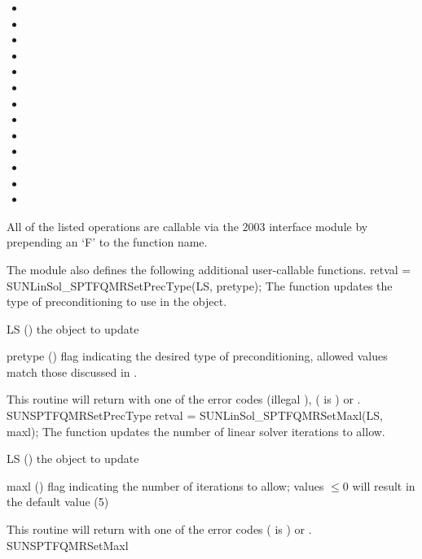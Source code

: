 \begin{itemize}
\item {}
\item {}
\item {}
\item {}
\item {}
\item {}
\item {}
\item {}
\item {}
\item {}
\item {}
\item {}
\item {}
\end{itemize}
All of the listed operations are callable via the {\F} 2003 interface module
by prepending an `F' to the function name.

The {\sunlinsolsptfqmr} module also defines the following additional
user-callable functions.
%
%
{
  retval = SUNLinSol\_SPTFQMRSetPrecType(LS, pretype);
}
{
  The function  updates the type of
  preconditioning to use in the {\sunlinsolsptfqmr} object.
}
{
  \begin{args}[pretype]
  \item[LS] ()
    the {\sunlinsolsptfqmr} object to update
  \item[pretype] ()
    flag indicating the desired type of preconditioning, allowed
    values match those discussed in .
  \end{args}
}
{
  This routine will return with one of the error codes
   (illegal ), 
  ( is ) or .
}
{}
{SUNSPTFQMRSetPrecType}
%
%
{
  retval = SUNLinSol\_SPTFQMRSetMaxl(LS, maxl);
}
{
  The function  updates the number of
  linear solver iterations to allow.
}
{
  \begin{args}[maxl]
  \item[LS] ()
    the {\sunlinsolsptfqmr} object to update
  \item[maxl] ()
    flag indicating the number of iterations to allow; values $\le0$
    will result in the default value (5)
  \end{args}
}
{
  This routine will return with one of the error codes
   ( is ) or .
}
{}
{SUNSPTFQMRSetMaxl}


